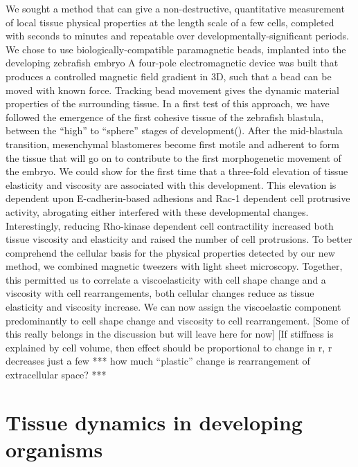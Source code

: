 We sought a method that can give a non-destructive, quantitative measurement of local tissue physical properties at the length scale of a few cells, completed with seconds to minutes and repeatable over developmentally-significant periods.
We chose to use biologically-compatible paramagnetic beads, implanted into the developing zebrafish embryo
A four-pole electromagnetic device was built that produces a controlled magnetic field gradient in 3D, such that a bead can be moved with known force.
Tracking bead movement gives the dynamic material properties of the surrounding tissue.
In a first test of this approach, we have followed the emergence of the first cohesive tissue of the zebrafish blastula, between the “high” to “sphere” stages of development().
After the mid-blastula transition, mesenchymal blastomeres become first motile and adherent to form the tissue that will go on to contribute to the first morphogenetic movement of the embryo.
We could show for the first time that a three-fold elevation of tissue elasticity and viscosity are associated with this development.
This elevation is dependent upon E-cadherin-based adhesions and Rac-1 dependent cell protrusive activity, abrogating either interfered with these developmental changes.
Interestingly, reducing Rho-kinase dependent cell contractility increased both tissue viscosity and elasticity and raised the number of cell protrusions.
To better comprehend the cellular basis for the physical properties detected by our new method, we combined magnetic tweezers with light sheet microscopy.
Together, this permitted us to correlate a viscoelasticity with cell shape change and a viscosity with cell rearrangements, both cellular changes reduce as tissue elasticity and viscosity increase.
We can now assign the viscoelastic component predominantly to cell shape change and viscosity to cell rearrangement.
[Some of this really belongs in the discussion but will leave here for now]
[If stiffness is explained by cell volume, then effect should be proportional to change in r, r decreases just a few %
*** how much “plastic” change is rearrangement of extracellular space? ***

\section{Tissue dynamics in developing organisms}


